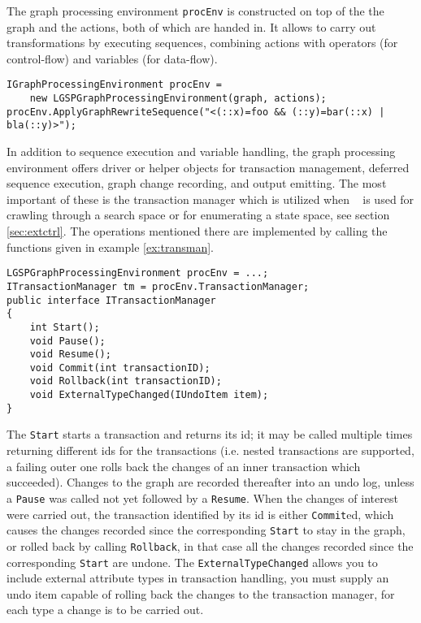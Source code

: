 \begin{example}\label{ex:procenv}
The graph processing environment \texttt{procEnv} is constructed on top of the the graph and the actions, both of which are handed in.
It allows to carry out transformations by executing sequences, combining actions with operators (for control-flow) and variables (for data-flow).

\begin{verbatim}
IGraphProcessingEnvironment procEnv = 
    new LGSPGraphProcessingEnvironment(graph, actions);
procEnv.ApplyGraphRewriteSequence("<(::x)=foo && (::y)=bar(::x) | bla(::y)>");
\end{verbatim}
\end{example}

In addition to sequence execution and variable handling, the graph processing environment offers driver or helper objects for transaction management, deferred sequence execution, graph change recording, and output emitting.
The most important of these is the transaction manager which is utilized when \GrG~ is used for crawling through a search space or for enumerating a state space, see section \ref{sec:extctrl}.
The operations mentioned there are implemented by calling the functions given in example \ref{ex:transman}.

\begin{example}\label{ex:transman}
\begin{verbatim}
LGSPGraphProcessingEnvironment procEnv = ...;
ITransactionManager tm = procEnv.TransactionManager;
public interface ITransactionManager
{
    int Start();
    void Pause();
    void Resume();
    void Commit(int transactionID);
    void Rollback(int transactionID);
    void ExternalTypeChanged(IUndoItem item);
}
\end{verbatim}
\end{example}

The \texttt{Start} starts a transaction and returns its id; it may be called multiple times returning different ids for the transactions (i.e. nested transactions are supported, a failing outer one rolls back the changes of an inner transaction which succeeded).
Changes to the graph are recorded thereafter into an undo log, unless a \texttt{Pause} was called not yet followed by a \texttt{Resume}.
When the changes of interest were carried out, the transaction identified by its id is either \texttt{Commit}ed, which causes the changes recorded since the corresponding \texttt{Start} to stay in the graph, or rolled back by calling \texttt{Rollback}, in that case all the changes recorded since the corresponding \texttt{Start} are undone.
The \texttt{ExternalTypeChanged} allows you to include external attribute types in transaction handling, you must supply an undo item capable of rolling back the changes to the transaction manager, for each type a change is to be carried out.

